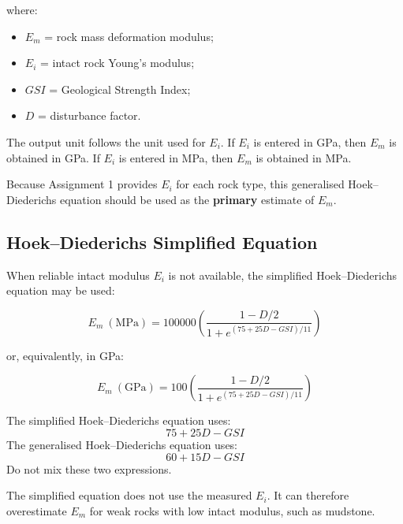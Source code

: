 \documentclass[a4paper,12pt]{article}
\begin{document}
where:
\begin{itemize}
    \item \(E_m\) = rock mass deformation modulus;
    \item \(E_i\) = intact rock Young's modulus;
    \item \(GSI\) = Geological Strength Index;
    \item \(D\) = disturbance factor.
\end{itemize}

\begin{notebox}[Units]
The output unit follows the unit used for \(E_i\). If \(E_i\) is entered in GPa, then
\(E_m\) is obtained in GPa. If \(E_i\) is entered in MPa, then \(E_m\) is obtained in MPa.
\end{notebox}

\begin{keybox}
Because Assignment 1 provides \(E_i\) for each rock type, this generalised
Hoek--Diederichs equation should be used as the \textbf{primary} estimate of \(E_m\).
\end{keybox}

\subsection{Hoek--Diederichs Simplified Equation}

When reliable intact modulus \(E_i\) is not available, the simplified Hoek--Diederichs
equation may be used:

\[
E_m~(\text{MPa}) =
100000
\left(
\frac{1-D/2}
{1+e^{(75+25D-GSI)/11}}
\right)
\]

or, equivalently, in GPa:

\[
E_m~(\text{GPa}) =
100
\left(
\frac{1-D/2}
{1+e^{(75+25D-GSI)/11}}
\right)
\]

\begin{warnbox}
The simplified Hoek--Diederichs equation uses:
\[
75+25D-GSI
\]
The generalised Hoek--Diederichs equation uses:
\[
60+15D-GSI
\]
Do not mix these two expressions.
\end{warnbox}

\begin{warnbox}[Limitation]
The simplified equation does not use the measured \(E_i\). It can therefore overestimate
\(E_m\) for weak rocks with low intact modulus, such as mudstone.
\end{warnbox}
\end{document}
